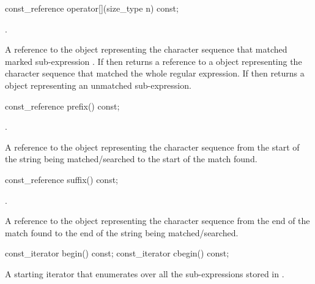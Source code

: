 %
\begin{itemdecl}
const_reference operator[](size_type n) const;
\end{itemdecl}

\begin{itemdescr}
\pnum
\expects
{}.

\pnum
\returns
A reference to the  object representing the
character sequence that matched marked sub-expression . If 
then returns a reference to a  object representing the
character sequence that matched the whole regular expression. If
 then returns a  object representing an
unmatched sub-expression.
\end{itemdescr}

%
\begin{itemdecl}
const_reference prefix() const;
\end{itemdecl}

\begin{itemdescr}
\pnum
\expects
{}.

\pnum
\returns
A reference to the  object representing the
character sequence from the start of the string being
matched/searched to the start of the match found.
\end{itemdescr}

%
\begin{itemdecl}
const_reference suffix() const;
\end{itemdecl}

\begin{itemdescr}
\pnum
\expects
{}.

\pnum
\returns
A reference to the  object representing the
character sequence from the end of the match found to the end of the
string being matched/searched.
\end{itemdescr}

%
\begin{itemdecl}
const_iterator begin() const;
const_iterator cbegin() const;
\end{itemdecl}

\begin{itemdescr}
\pnum
\returns
A starting iterator that enumerates over all the
sub-expressions stored in .
\end{itemdescr}

